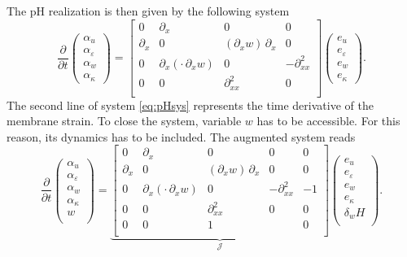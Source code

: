 \documentclass{ifacconf}
\begin{document}
The pH realization is then given by the following system
\begin{equation}\label{eq:pHsys}
	\frac{\partial}{\partial t}
	\begin{pmatrix}
		\alpha_u \\
		\alpha_\varepsilon \\
		\alpha_w \\
		\alpha_\kappa
	\end{pmatrix} = 
	\begin{bmatrix}
		0 & \partial_x & 0 & 0 \\
		\partial_x & 0 & (\partial_x w) \, \partial_x & 0 \\
		0 & \partial_x(\cdot \, \partial_x w) & 0 & -\partial_{xx}^2 \\
		0 & 0 & \partial_{xx}^2 & 0 \\ 
	\end{bmatrix}
	\begin{pmatrix}
		e_u \\
		e_\varepsilon \\
		e_w \\
		e_\kappa 
	\end{pmatrix}.
\end{equation}
The second line of system \eqref{eq:pHsys} represents the time derivative of the membrane strain. To close the system, variable $w$ has to be accessible. For this reason, its dynamics has to be included. The augmented system reads
\begin{equation}\label{eq:pHsys_aug}
	\frac{\partial}{\partial t}
	\begin{pmatrix}
		\alpha_u \\
		\alpha_\varepsilon \\
		\alpha_w \\
		\alpha_\kappa \\
		w \\
	\end{pmatrix} = 
	\underbrace{\begin{bmatrix}
			0 & \partial_x & 0 & 0 & 0\\
			\partial_x & 0 & (\partial_x w) \, \partial_x & 0 & 0 \\
			0 & \partial_x(\cdot \, \partial_x w) & 0 & -\partial_{xx}^2 & -1 \\
			0 & 0 & \partial_{xx}^2 & 0 & 0 \\ 
			0 & 0 & 1 &  & 0 \\
	\end{bmatrix}}_{\mathcal{J}}
	\begin{pmatrix}
		e_u \\
		e_\varepsilon \\
		e_w \\
		e_\kappa \\
		\delta_w H  \\
	\end{pmatrix}.
\end{equation}
\end{document}
